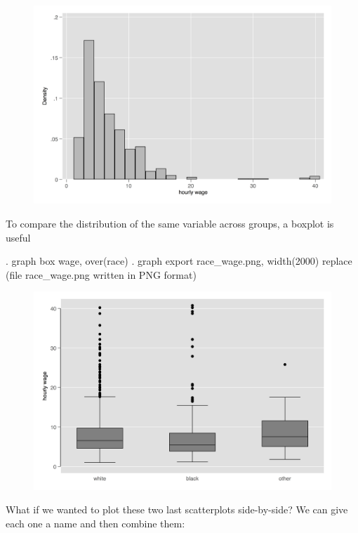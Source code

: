 \documentclass[]{article}
\begin{document}
\begin{figure}
\centering
\includegraphics[width=1.00000\textwidth]{wage_blk.png}
\caption{}
\end{figure}

To compare the distribution of the same variable across groups, a
boxplot is useful

\begin{stlog}
. graph box wage, over(race)
{\smallskip}
. graph export race_wage.png, width(2000) replace
(file race_wage.png written in PNG format)
{\smallskip}
\end{stlog}

\begin{figure}
\centering
\includegraphics[width=1.00000\textwidth]{race_wage.png}
\caption{}
\end{figure}

What if we wanted to plot these two last scatterplots side-by-side? We
can give each one a name and then combine them:
\end{document}
